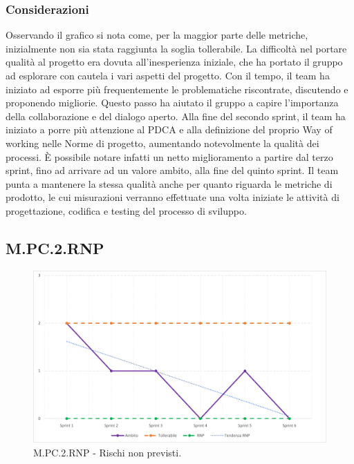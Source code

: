\subsubsection{Considerazioni}
Osservando il grafico si nota come, per la maggior parte delle metriche, inizialmente non sia stata raggiunta la soglia tollerabile.
La difficoltà nel portare qualità al progetto era dovuta all’inesperienza iniziale, che ha portato il gruppo ad esplorare con cautela i vari aspetti del progetto.
Con il tempo, il team ha iniziato ad esporre più frequentemente le problematiche riscontrate, discutendo e proponendo migliorie.
Questo passo ha aiutato il gruppo a capire l’importanza della collaborazione e del dialogo aperto.
Alla fine del secondo sprint, il team ha iniziato a porre più attenzione al PDCA e alla definizione del proprio Way of working nelle Norme di progetto, aumentando notevolmente la qualità dei processi.
È possibile notare infatti un netto miglioramento a partire dal terzo sprint, fino ad arrivare ad un valore ambito, alla fine del quinto sprint. 
Il team punta a mantenere la stessa qualità anche per quanto riguarda le metriche di prodotto, le cui misurazioni verranno effettuate una volta iniziate le attività di progettazione, codifica e testing del processo di sviluppo.
\subsection{M.PC.2.RNP}
\begin{figure}[H]
\includegraphics[width=15.5cm]{img/metriche/MPC2RNP.png}
\caption{M.PC.2.RNP - Rischi non previsti.}
\end{figure}
